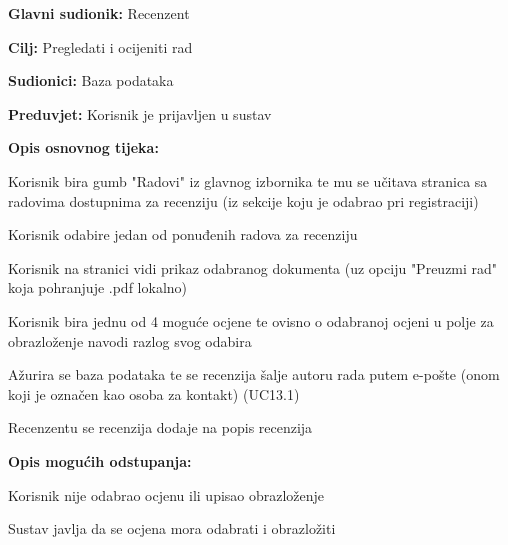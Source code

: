 				
					\noindent {}
					\begin{packed_item}
						
						\item \textbf{Glavni sudionik:} Recenzent
						\item \textbf{Cilj:} Pregledati i ocijeniti rad
						\item \textbf{Sudionici:} Baza podataka
						\item \textbf{Preduvjet:} Korisnik je prijavljen u sustav
						\item \textbf{Opis osnovnog tijeka:} 
						
						\item[] \begin{packed_enum}
							
							\item Korisnik bira gumb "Radovi" iz glavnog izbornika te mu se učitava stranica sa radovima dostupnima za recenziju (iz sekcije koju je odabrao pri registraciji)
							\item Korisnik odabire jedan od ponuđenih radova za recenziju
							\item  Korisnik na stranici vidi prikaz odabranog dokumenta (uz opciju "Preuzmi rad" koja pohranjuje .pdf lokalno)
							\item Korisnik bira jednu od 4 moguće ocjene te ovisno o odabranoj ocjeni u polje za obrazloženje navodi razlog svog odabira
							\item Ažurira se baza podataka te se recenzija šalje autoru rada putem e-pošte (onom koji je označen kao osoba za kontakt) (UC13.1)
							\item Recenzentu se recenzija dodaje na popis recenzija
							
							
						\end{packed_enum}
						
						\item \textbf{Opis mogućih odstupanja:}
						
						\item[] \begin{packed_enum}
							\item[4.a] Korisnik nije odabrao ocjenu ili upisao obrazloženje
							\item[] \begin{packed_enum}
								\item[1.] Sustav javlja da se ocjena mora odabrati i obrazložiti
							\end{packed_enum}
							

\end{packed_enum}
\end{packed_item}
